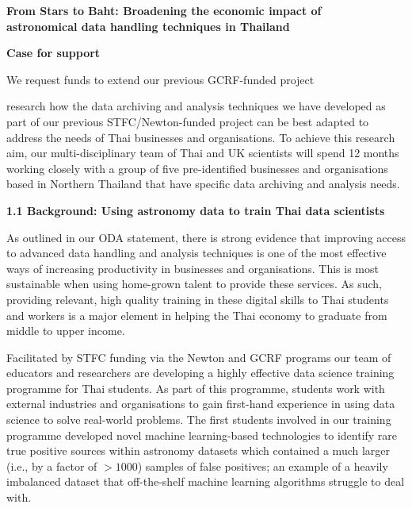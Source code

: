 \documentclass[11pt]{article}
\begin{document}
  \setcounter{figure}{0}
  \noindent
  {\LARGE \bf From Stars to Baht: Broadening the economic impact of \\
  astronomical data handling techniques in Thailand}
  
  \vspace{3mm}
  \noindent
  {\LARGE \bf Case for support}
  \vspace{3mm}
  
  \noindent
  We request funds to extend our previous GCRF-funded project 
  
  research how the data archiving and analysis techniques we have developed as part of our previous STFC/Newton-funded project can be best adapted to address the needs of Thai businesses and organisations. To achieve this research aim, our multi-disciplinary team of Thai and UK scientists will spend 12 months working closely with a group of five pre-identified businesses and organisations based in Northern Thailand that have specific data archiving and analysis needs.
  
  \vspace{3mm}
  \noindent
  {\large \bf 1.1 Background: Using astronomy data to train Thai data scientists}
  
  \noindent
  As outlined in our ODA statement, there is strong evidence that improving access to advanced data handling and analysis techniques is one of the most effective ways of increasing productivity in businesses and organisations. This is most sustainable when using home-grown talent to provide these services. As such, providing relevant, high quality training in these digital skills to Thai students and workers is a major element in helping the Thai economy to graduate from middle to upper income. 
  
  Facilitated by STFC funding via the Newton and GCRF programs our team of educators and researchers are developing a highly effective data science training programme for Thai students. As part of this programme, students work with external industries and organisations to gain first-hand experience in using data science to solve real-world problems. The first students involved in our training programme developed novel machine learning-based technologies to identify rare true positive sources within astronomy datasets which contained a much larger (i.e., by a factor of $>1000$) samples of false positives; an example of a heavily imbalanced dataset that off-the-shelf machine learning algorithms struggle to deal with.
  
\end{document}
